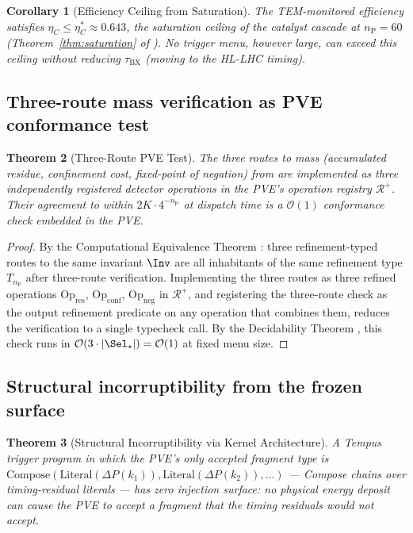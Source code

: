 \documentclass[twocolumn,10pt,a4paper]{article}
\theoremstyle{thmstyle}
\newtheorem{theorem}{Theorem}[section]
\newtheorem{corollary}[theorem]{Corollary}
\theoremstyle{definition}
\theoremstyle{remark}
\newcommand{\nP}{n_{\mathrm{P}}}
\newcommand{\tBX}{\tau_{\mathrm{BX}}}
\newcommand{\DeltaP}{\Delta P}
\newcommand{\etaC}{\eta_{C}}
\newcommand{\vLit}[1]{\mathrm{Literal}(#1)}
\newcommand{\vComp}[1]{\mathrm{Compose}(#1)}
\newcommand{\Reg}{\mathcal{R}}
\begin{document}
\begin{corollary}[Efficiency Ceiling from Saturation]
The TEM-monitored efficiency satisfies $\etaC \leq \etaC^* \approx 0.643$,
the saturation ceiling of the catalyst cascade at $\nP = 60$
(Theorem~\ref{thm:saturation} of \citealt{companion:cascade}).
No trigger menu, however large, can exceed this ceiling without reducing
$\tBX$ (moving to the HL-LHC timing).
\end{corollary}

\subsection{Three-route mass verification as PVE conformance test}

\begin{theorem}[Three-Route PVE Test]
\label{thm:three_route_pve}
The three routes to mass (accumulated residue, confinement cost, fixed-point
of negation) from \citet{companion:spectrometer} are implemented as three
independently registered detector operations in the PVE's operation registry
$\Reg^+$. Their agreement to within $2K \cdot 4^{-\nP}$ at dispatch time
is a $\mathcal{O}(1)$ conformance check embedded in the PVE.
\end{theorem}

\begin{proof}
By the Computational Equivalence Theorem \citep{companion:verification}:
three refinement-typed routes to the same invariant $\Inv$ are all
inhabitants of the same refinement type $T_\nP$ after three-route
verification. Implementing the three routes as three refined operations
$\mathrm{Op}_{\mathrm{res}}$, $\mathrm{Op}_{\mathrm{conf}}$,
$\mathrm{Op}_{\mathrm{neg}}$ in $\Reg^+$, and registering the three-route
check as the output refinement predicate on any operation that combines
them, reduces the verification to a single $\mathrm{typecheck}$ call.
By the Decidability Theorem \citep{companion:types}, this check runs in
$\mathcal{O}(3 \cdot |\Sel_\star|) = \mathcal{O}(1)$ at fixed menu size.
\end{proof}

\subsection{Structural incorruptibility from the frozen surface}

\begin{theorem}[Structural Incorruptibility via Kernel Architecture]
\label{thm:incorruptibility_kernel}
A Tempus trigger program in which the PVE's only accepted fragment type is
$\vComp{\vLit{\DeltaP(k_1)}, \vLit{\DeltaP(k_2)}, \ldots}$
— Compose chains over timing-residual literals — has zero injection surface:
no physical energy deposit can cause the PVE to accept a fragment that the
timing residuals would not accept.
\end{theorem}
\end{document}
